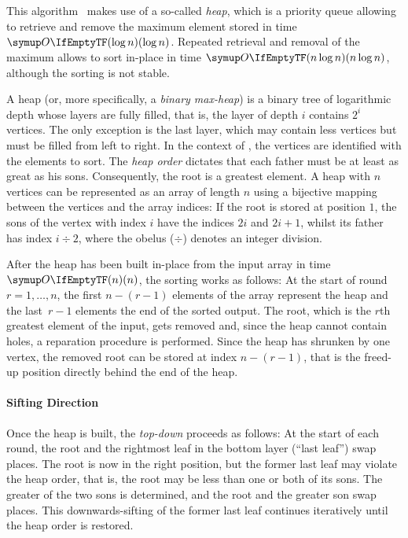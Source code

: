 \section{\texorpdfstring{\HS{}}{HeapSort}}
\label{sec:tasklet:heap}

This algorithm~\cites{floyd1964treesort}{williams1964heapsort}[Chapter~2.2.5]{wirth1975algorithmen} makes use of a so-called \emph{heap}, which is a priority queue allowing to retrieve and remove the maximum element stored in time \(\bigoh{\log n}\).
Repeated retrieval and removal of the maximum allows to sort in-place in time \(\bigoh{n \log n}\), although the sorting is not stable.

A heap (or, more specifically, a \emph{binary max-heap}) is a binary tree of logarithmic depth whose layers are fully filled, that is, the layer of depth \(i\) contains \(2^i\) vertices.
The only exception is the last layer, which may contain less vertices but must be filled from left to right.
In the context of \HS{}, the vertices are identified with the elements to sort.
The \emph{heap order} dictates that each father must be at least as great as his sons.
Consequently, the root is a greatest element.
A heap with \(n\) vertices can be represented as an array of length \(n\) using a bijective mapping between the vertices and the array indices:
If the root is stored at position \(1\), the sons of the vertex with index \(i\) have the indices \(2 i\) and \(2 i + 1\), whilst its father has index \(i \div 2\), where the obelus (\(\div\)) denotes an integer division.

After the heap has been built in-place from the input array in time \(\bigoh{n}\), the sorting works as follows:
At the start of round~\(r = 1, \dots, n\), the first \(n - (r - 1)\) elements of the array represent the heap and the last~\(r - 1\) elements the end of the sorted output.
The root, which is the \(r\)th greatest element of the input, gets removed and, since the heap cannot contain holes, a reparation procedure is performed.
Since the heap has shrunken by one vertex, the removed root can be stored at index \(n - (r - 1)\), that is the freed-up position directly behind the end of the heap.


\paragraph{Sifting Direction}
Once the heap is built, the \emph{top-down} \HS{} proceeds as follows:
At the start of each round, the root and the rightmost leaf in the bottom layer (\enquote{last leaf}) swap places.
The root is now in the right position, but the former last leaf may violate the heap order, that is, the root may be less than one or both of its sons.
The greater of the two sons is determined, and the root and the greater son swap places.
This downwards-sifting of the former last leaf continues iteratively until the heap order is restored.

